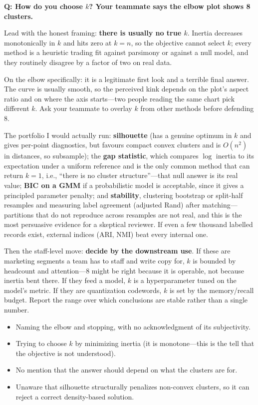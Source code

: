 \begin{interviewq}
\textbf{Q: How do you choose $k$? Your teammate says the elbow plot shows 8 clusters.}

 \quad {} \quad \badgefreq{\freqhigh}

\stronganswer

Lead with the honest framing: \textbf{there is usually no true $k$}. Inertia decreases monotonically in $k$ and hits zero at $k=n$, so the objective cannot select $k$; every method is a heuristic trading fit against parsimony or against a null model, and they routinely disagree by a factor of two on real data.

On the elbow specifically: it is a legitimate first look and a terrible final answer. The curve is usually smooth, so the perceived kink depends on the plot's aspect ratio and on where the axis starts---two people reading the same chart pick different $k$. Ask your teammate to overlay $k$ from other methods before defending 8.

The portfolio I would actually run: \textbf{silhouette} (has a genuine optimum in $k$ and gives per-point diagnostics, but favours compact convex clusters and is $O(n^2)$ in distances, so subsample); the \textbf{gap statistic}, which compares $\log$ inertia to its expectation under a uniform reference and is the only common method that can return $k=1$, i.e., ``there is no cluster structure''---that null answer is its real value; \textbf{BIC on a GMM} if a probabilistic model is acceptable, since it gives a principled parameter penalty; and \textbf{stability}, clustering bootstrap or split-half resamples and measuring label agreement (adjusted Rand) after matching---partitions that do not reproduce across resamples are not real, and this is the most persuasive evidence for a skeptical reviewer. If even a few thousand labelled records exist, external indices (ARI, NMI) beat every internal one.

Then the staff-level move: \textbf{decide by the downstream use}. If these are marketing segments a team has to staff and write copy for, $k$ is bounded by headcount and attention---8 might be right because it is operable, not because inertia bent there. If they feed a model, $k$ is a hyperparameter tuned on the model's metric. If they are quantization codewords, $k$ is set by the memory/recall budget. Report the range over which conclusions are stable rather than a single number.

\redflags
\begin{itemize}
    \item Naming the elbow and stopping, with no acknowledgment of its subjectivity.
    \item Trying to choose $k$ by minimizing inertia (it is monotone---this is the tell that the objective is not understood).
    \item No mention that the answer should depend on what the clusters are for.
    \item Unaware that silhouette structurally penalizes non-convex clusters, so it can reject a correct density-based solution.
\end{itemize}


\end{interviewq}
